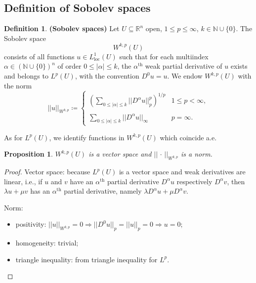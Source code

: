\documentclass[12pt]{article}
\newtheorem{proposition}{Proposition}[section]
\theoremstyle{definition}
\newtheorem{definition}{Definition}[section]
\begin{document}
\subsection{Definition of Sobolev spaces}
\begin{definition}
\textbf{(Sobolev spaces)} Let $U\subseteq\mathbb R^n$ open, $1\leq p\leq\infty$, $k\in\mathbb N\cup\{0\}$. The Sobolev space
\[W^{k,p}(U)\]
consists of all functions $u\in L_\text{loc}^1(U)$ such that for each multiindex $\alpha\in(\mathbb N\cup\{0\})^n$ of order $0\leq|\alpha|\leq k$, the $\alpha^\text{th}$ weak partial derivative of $u$ exists and belongs to $L^p(U)$, with the convention $D^0u=u$. We endow $W^{k,p}(U)$ with the norm
\[||u||_{W^{k,p}}\coloneqq\left\{\begin{array}{cc}\displaystyle{\left(\sum_{0\leq|\alpha|\leq k}||D^\alpha u||_p^p\right)^{1/p}}&1\leq p<\infty,\\\\\displaystyle{\sum_{0\leq|\alpha|\leq k}||D^\alpha u||_\infty}&p=\infty.\end{array}\right.\]

As for $L^p(U)$, we identify functions in $W^{k,p}(U)$ which coincide a.e.
\end{definition}

\begin{proposition}
$W^{k,p}(U)$ is a vector space and $||\,\cdot\,||_{W^{k,p}}$ is a norm.
\end{proposition}

\begin{proof}
Vector space: because $L^p(U)$ is a vector space and weak derivatives are linear, i.e., if $u$ and $v$ have an $\alpha^\text{th}$ partial derivative $D^\alpha u$ respectively $D^\alpha v$, then $\lambda u+\mu v$ has an $\alpha^\text{th}$ partial derivative, namely $\lambda D^\alpha u+\mu D^\alpha v$.

Norm:
\begin{itemize}
\item positivity: $||u||_{W^{k,p}}=0\Rightarrow||D^0u||_p=||u||_p=0\Rightarrow u=0$;
\item homogeneity: trivial;
\item triangle inequality: from triangle inequality for $L^p$.
\end{itemize}
\end{proof}
\end{document}
